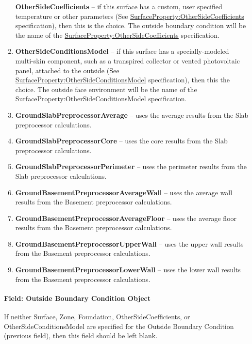 \begin{enumerate}
    \textbf{OtherSideCoefficients} -- if this surface has a custom, user specified temperature or other parameters (See \hyperref[surfacepropertyothersidecoefficients]{SurfaceProperty:OtherSideCoefficients} specification), then this is the choice. The outside boundary condition will be the name of the \hyperref[surfacepropertyothersidecoefficients]{SurfaceProperty:OtherSideCoefficients} specification.
  \item
    \textbf{OtherSideConditionsModel} -- if this surface has a specially-modeled multi-skin component, such as a transpired collector or vented photovoltaic panel, attached to the outside (See \hyperref[surfacepropertyothersideconditionsmodel]{SurfaceProperty:OtherSideConditionsModel} specification), then this the choice. The outside face environment will be the name of the \hyperref[surfacepropertyothersideconditionsmodel]{SurfaceProperty:OtherSideConditionsModel} specification.
  \item
    \textbf{GroundSlabPreprocessorAverage} -- uses the average results from the Slab preprocessor calculations.
  \item
    \textbf{GroundSlabPreprocessorCore} -- uses the core results from the Slab preprocessor calculations.
  \item
    \textbf{GroundSlabPreprocessorPerimeter} -- uses the perimeter results from the Slab preprocessor calculations.
  \item
    \textbf{GroundBasementPreprocessorAverageWall} -- uses the average wall results from the Basement preprocessor calculations.
  \item
    \textbf{GroundBasementPreprocessorAverageFloor} -- uses the average floor results from the Basement preprocessor calculations.
  \item
    \textbf{GroundBasementPreprocessorUpperWall} -- uses the upper wall results from the Basement preprocessor calculations.
  \item
    \textbf{GroundBasementPreprocessorLowerWall} -- uses the lower wall results from the Basement preprocessor calculations.
\end{enumerate}

\paragraph{Field: Outside Boundary Condition Object}\label{field-outside-boundary-condition-object-7}

If neither Surface, Zone, Foundation, OtherSideCoefficients, or OtherSideConditionsModel are specified for the Outside Boundary Condition (previous field), then this field should be left blank.

